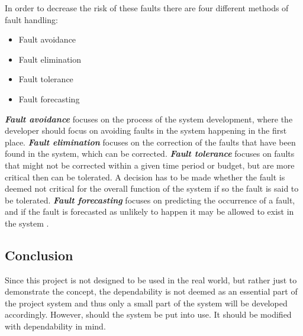 In order to decrease the risk of these faults there are four different methods of fault handling:
\begin{itemize}
\item Fault avoidance
\item Fault elimination
\item Fault tolerance
\item Fault forecasting
\end{itemize}
\textit{\textbf{Fault avoidance}} focuses on the process of the system development, where the developer should focus on avoiding faults in the system happening in the first place.
\textit{\textbf{Fault elimination}} focuses on the correction of the faults that have been found in the system, which can be corrected. 
\textit{\textbf{Fault tolerance}} focuses on faults that might not be corrected within a given time period or budget, but are more critical then can be tolerated.
A decision has to be made whether the fault is deemed not critical for the overall function of the system if so the fault is said to be tolerated.
\textit{\textbf{Fault forecasting}} focuses on predicting the occurrence of a fault, and if the fault is forecasted as unlikely to happen it may be allowed to exist in the system \cite{FundementalsOfDependableComputingForSoftwareEngineers}. 

\subsection{Conclusion}
Since this project is not designed to be used in the real world, but rather just to demonstrate the concept, the dependability is not deemed as an essential part of the project system and thus only a small part of the system will be developed accordingly.
However, should the system be put into use.
It should be modified with dependability in mind. 
